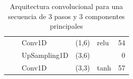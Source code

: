 \begin{table}[]
\begin{center}
\begin{tabular}{ll|l|r|l|r|}
\multicolumn{1}{|l|}{}                              &                             & Conv1D                             & (1,6)                                & relu                                     & 54                                          \\ \cline{3-6} 
\multicolumn{1}{|l|}{}                              &                             & UpSampling1D                       & (3,6)                                &                                          & 0                                           \\ \cline{3-6} 
\multicolumn{1}{|l|}{}                              &                             & Conv1D                             & \multicolumn{1}{l|}{(3,3)}           & tanh                                     & 57                                          \\ \hline
\end{tabular}
\end{center}
\caption{Arquitectura convolucional para una secuencia de 3 pasos y 3 componentes principales}
\label{table:cnn33}
\end{table}



